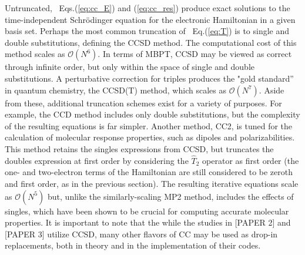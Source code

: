 Untruncated, ~Eqs.(\ref{eq:cc_E}) and (\ref{eq:cc_res}) produce exact solutions to the time-independent 
Schr\"odinger equation for the electronic Hamiltonian in a given basis set. Perhaps the most common 
truncation of ~Eq.(\ref{eq:T}) is to single and double substitutions, defining the CCSD method. 
The computational cost of this method scales as $\mathcal{O}(N^6)$. In terms of MBPT, CCSD may be viewed 
as correct through infinite order, but only within the space of single and double substitutions.
A perturbative correction for triples produces the "gold standard'' in quantum chemistry, 
the CCSD(T) method, which scales as $\mathcal{O}(N^7)$. Aside from these, additional truncation schemes exist 
for a variety of purposes. For example, the CCD method includes only double substitutions, but the 
complexity of the resulting equations is far simpler. Another method, CC2, is tuned for the calculation
of molecular response properties, such as dipoles and polarizabilities. This method retains the singles
expressions from CCSD, but truncates the doubles expression at first order by considering the $\hat{T}_2$ 
operator as first order (the one- and two-electron terms of the Hamiltonian are still considered to be
zeroth and first order, as in the previous section). The resulting iterative equations scale as 
$\mathcal{O}(N^5)$ but, unlike the similarly-scaling MP2 method, includes the effects of singles, which 
have been shown to be crucial for computing accurate molecular properties. It is important to note that
the while the studies in [PAPER 2] and [PAPER 3] utilize CCSD, many other flavors of CC may be used as
drop-in replacements, both in theory and in the implementation of their codes. 

